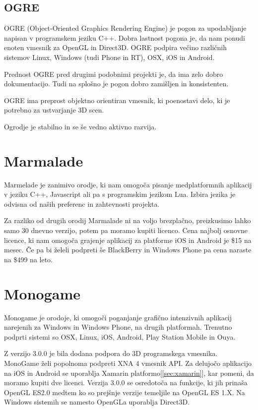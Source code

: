 \subsection{OGRE}

OGRE (Object-Oriented Graphics Rendering Engine) je pogon za upodabljanje napisan v programskem jeziku C++. Dobra lastnost pogona je, da nam ponudi enoten vmesnik za OpenGL in Direct3D. OGRE podpira večino različnih sistemov Linux, Windows (tudi Phone in RT), OSX, iOS in Android.

Prednost OGRE pred drugimi podobnimi projekti je, da ima zelo dobro dokumentacijo. Tudi na splošno je pogon dobro zamišljen in konsistenten.

OGRE ima preprost objektno orientiran vmesnik, ki poenostavi delo, ki je potrebno za ustvarjanje 3D scen.

Ogrodje je stabilno in se še vedno aktivno razvija.

\section{Marmalade}

Marmelade \cite{marmalade} je zanimivo orodje, ki nam omogoča pisanje medplatformnih aplikacij v jeziku C++, Javascript ali pa s programskim jezikom Lua. Izbira jezika je odvisna od naših preferenc in zahtevnosti projekta.

Za razliko od drugih orodij Marmalade ni na voljo brezplačno, preizkusimo lahko samo 30 dnevno verzijo, potem pa moramo kupiti licenco. Cena najbolj osnovne licence, ki nam omogoča grajenje aplikacij za platforme iOS in Android je \$15 na mesec. Če pa bi želeli podpreti še BlackBerry in Windows Phone pa cena naraste na \$499 na leto.

\section{Monogame}

Monogame je orodoje, ki omogoči poganjanje grafično intenzivnih aplikacij narejenih za Windows in Windows Phone, na drugih platformah. Trenutno podprti sistemi so OSX, Linux, iOS, Android, Play Station Mobile in Ouya. 

Z verzijo 3.0.0 je bila dodana podpora do 3D programskega vmesnika. MonoGame želi popolnoma podpreti XNA 4 vmesnik API. Za delujočo aplikacijo na iOS in Android se uporablja Xamarin platformo[\ref{sec:xamarin}], kar pomeni, da moramo kupiti dve licenci. Verzija 3.0.0 se osredotoča na funkcije, ki jih prinaša OpenGL ES2.0 medtem ko so prejšnje verzije temeljile na OpenGL ES 1.X. Na Windows sistemih se namesto OpenGLa uporablja Direct3D.


